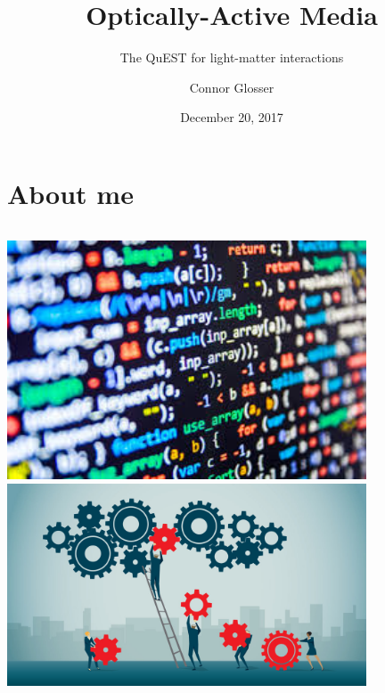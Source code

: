 \documentclass[aspectratio=169]{beamer}
\title{Optically-Active Media}
\subtitle{The QuEST for light-matter interactions}
\date{December 20, 2017}
\author{Connor Glosser}
\institute{Michigan State University}
\begin{document}
\maketitle

\section{About me}

\begin{frame}
  \vspace{0.7cm}
  \begin{columns}[c]
      \hfill \includegraphics[width=0.8\textwidth]{figures/coding.jpg} \\ \vspace{0.6cm}
      \hfill \includegraphics[width=0.8\textwidth]{figures/collaboration.jpg}


\end{columns}
\end{frame}
\end{document}
